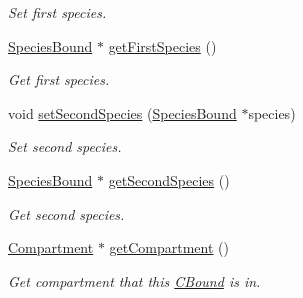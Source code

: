 \begin{DoxyCompactItemize}
\begin{DoxyCompactList}\small\item\em Set first species. \end{DoxyCompactList}\item 
\hyperlink{classSpeciesBound}{Species\+Bound} $\ast$ \hyperlink{classCBound_aad60656a671e4ffdc45b4c904fa7c320}{get\+First\+Species} ()
\begin{DoxyCompactList}\small\item\em Get first species. \end{DoxyCompactList}\item 
void \hyperlink{classCBound_a01badbb54867fb99b6f3a895d555867a}{set\+Second\+Species} (\hyperlink{classSpeciesBound}{Species\+Bound} $\ast$species)
\begin{DoxyCompactList}\small\item\em Set second species. \end{DoxyCompactList}\item 
\hyperlink{classSpeciesBound}{Species\+Bound} $\ast$ \hyperlink{classCBound_a1e706b6472c40ae1d98a64eda0acdadf}{get\+Second\+Species} ()
\begin{DoxyCompactList}\small\item\em Get second species. \end{DoxyCompactList}\item 
\hyperlink{classCompartment}{Compartment} $\ast$ \hyperlink{classCBound_a6c4d7b1b35d06725c8659424bf0c3f18}{get\+Compartment} ()
\begin{DoxyCompactList}\small\item\em Get compartment that this \hyperlink{classCBound}{C\+Bound} is in. \end{DoxyCompactList}\end{DoxyCompactItemize}
